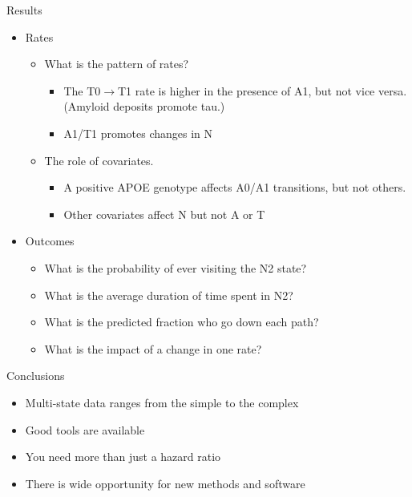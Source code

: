 \begin{frame}{Results}
  \begin{itemize}
    \item Rates
      \begin{itemize}
        \item What is the pattern of rates?
          \begin{itemize}
            \item The T0$\rightarrow$T1 rate is higher in the presence of
              A1, but not vice versa.  (Amyloid deposits promote tau.)
            \item A1/T1 promotes changes in N
          \end{itemize}
        \item The role of covariates.
          \begin{itemize}
            \item A positive APOE genotype affects A0/A1 transitions, but
              not others.
            \item Other covariates affect N but not A or T
          \end{itemize}
      \end{itemize}
    \item Outcomes
      \begin{itemize}
        \item What is the probability of ever visiting the N2 state? 
          \item What is the average duration of time spent in N2?
          \item What is the predicted fraction who go down each path?
        \item What is the impact of a change in one rate?
      \end{itemize}
  \end{itemize}
\end{frame}

\begin{frame}{Conclusions}
  \begin{itemize}
    \item Multi-state data ranges from the simple to the complex
    \item Good tools are available
    \item You need more than just a hazard ratio
    \item There is wide opportunity for new methods and software
  \end{itemize}
\end{frame}

          

